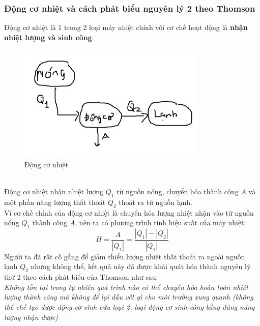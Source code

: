 \subsubsection{Động cơ nhiệt và cách phát biểu nguyên lý 2 theo Thomson}
Động cơ nhiệt là 1 trong 2 loại máy nhiệt chính với cơ chế hoạt động là \textbf{nhận nhiệt lượng và sinh công}.
\begin{figure}
    \centering
    \includegraphics[width=0.8\textwidth]{dongco.png}
    \caption{Động cơ nhiệt}
    \label{dongco}
\end{figure}
\\Động cơ nhiệt nhận nhiệt lượng $Q_{1}$ từ nguồn nóng, chuyển hóa thành công $A$ và một phần năng lượng thất thoát $Q_{2}$ thoát ra từ nguồn lạnh.
\\Vì cơ chế chính của động cơ nhiệt là chuyển hóa lượng nhiệt nhận vào từ nguồn nóng $Q_{1}$ thành công $A$, nên ta có phương trình tính hiệu suất của máy nhiệt:
$$H=\frac{A}{|Q_{1}|}=\frac{|Q_{1}|-|Q_{2}|}{|Q_{1}|}$$
Người ta đã rất cố gắng để giảm thiểu lượng nhiệt thất thoát ra ngoài nguồn lạnh $Q_{2}$ nhưng không thể, kết quả này đã được khái quát hóa thành nguyên lý thứ 2 theo cách phát biểu của Thomson như sau:
\\ \textit{Không tồn tại trong tự nhiên quá trình nào có thể chuyển hóa hoàn toàn nhiệt lượng thành công mà không để lại dấu vết gì cho môi trường xung quanh (không thể chế tạo được động cơ vĩnh cửu loại 2, loại động cơ sinh công bằng đúng năng lượng nhận được)} 
